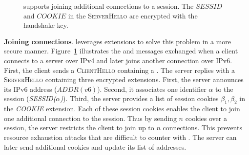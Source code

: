 \begin{figure}[!t]
	\centering
	\caption{\tcpls supports joining additional \tcp
		connections to a \tcpls session. The $SESSID$ and $COOKIE$ in the \textmd{\textsc{ServerHello}} are encrypted with the
		handshake key.}
	\label{fig:join-example}
\end{figure}

\textbf{Joining \tcp connections}. \tcpls leverages \tls
extensions to solve this problem in a more secure manner. 
Figure~\ref{fig:join-example} illustrates the \tls and \tcpls messages 
exchanged when a client connects to a server over IPv4 and later joins another 
connection over IPv6.
First, the client sends a \textsc{ClientHello} containing a \hello. The server 
replies with a \textsc{ServerHello} containing three encrypted extensions. 
First, the server announces its IPv6 address ($ADDR(v6)$). Second, it 
associates one identifier $\alpha$ to the \tcpls session 
(\emph{SESSID($\alpha$)}).
Third, the server provides a list of \tcpls session cookies $\beta_1,\beta_2$ in the \emph{COOKIE} extension. Each of these session cookies enables the client
to join one additional \tcp connection to the \tcpls session. Thus by 
sending $n$ cookies over a session, the server restricts the client to 
join up to $n$ \tcp connections. This prevents resource exhaustion attacks
that are difficult to counter with \mptcp. The server can later send additional
cookies and update its list of addresses.

